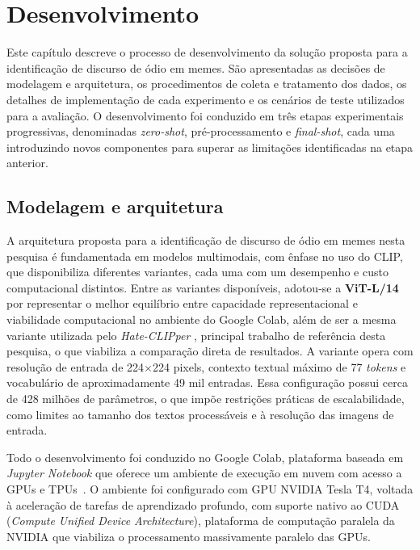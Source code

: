 \chapter{Desenvolvimento}
\label{cap:03}

Este capítulo descreve o processo de desenvolvimento da solução proposta para a identificação de discurso de ódio em memes. São apresentadas as decisões de modelagem e arquitetura, os procedimentos de coleta e tratamento dos dados, os detalhes de implementação de cada experimento e os cenários de teste utilizados para a avaliação. O desenvolvimento foi conduzido em três etapas experimentais progressivas, denominadas \textit{zero-shot}, pré-processamento e \textit{final-shot}, cada uma introduzindo novos componentes para superar as limitações identificadas na etapa anterior.

\section{Modelagem e arquitetura}

A arquitetura proposta para a identificação de discurso de ódio em memes nesta pesquisa é fundamentada em modelos multimodais, com ênfase no uso do CLIP, que disponibiliza diferentes variantes, cada uma com um desempenho e custo computacional distintos. Entre as variantes disponíveis, adotou-se a \textbf{ViT-L/14} por representar o melhor equilíbrio entre capacidade representacional e viabilidade computacional no ambiente do Google Colab, além de ser a mesma variante utilizada pelo \textit{Hate-CLIPper} \cite{kumar2022}, principal trabalho de referência desta pesquisa, o que viabiliza a comparação direta de resultados. A variante opera com resolução de entrada de 224$\times$224 pixels, contexto textual máximo de 77 \textit{tokens} e vocabulário de aproximadamente 49 mil entradas. Essa configuração possui cerca de 428 milhões de parâmetros, o que impõe restrições práticas de escalabilidade, como limites ao tamanho dos textos processáveis e à resolução das imagens de entrada.

Todo o desenvolvimento foi conduzido no Google Colab, plataforma baseada em \textit{Jupyter Notebook} que oferece um ambiente de execução em nuvem com acesso a GPUs e TPUs~\cite{googlecolab}. O ambiente foi configurado com GPU NVIDIA Tesla T4, voltada à aceleração de tarefas de aprendizado profundo, com suporte nativo ao CUDA (\textit{Compute Unified Device Architecture}), plataforma de computação paralela da NVIDIA que viabiliza o processamento massivamente paralelo das GPUs.

